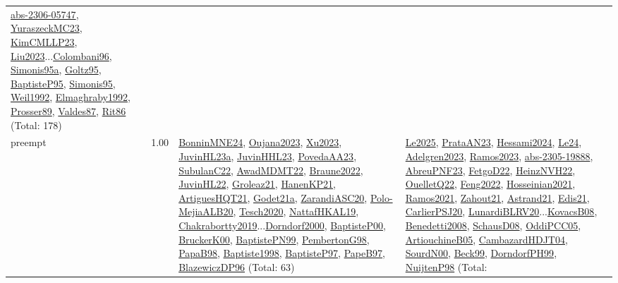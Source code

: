 {\begin{longtable}{p{3cm}r>{\raggedright\arraybackslash}p{6cm}>{\raggedright\arraybackslash}p{6cm}>{\raggedright\arraybackslash}p{8cm}}
\hyperref[detail:abs-2306-05747]{abs-2306-05747}, \hyperref[detail:YuraszeckMC23]{YuraszeckMC23}, \hyperref[detail:KimCMLLP23]{KimCMLLP23}, \hyperref[detail:Liu2023]{Liu2023}...\hyperref[detail:Colombani96]{Colombani96}, \hyperref[detail:Simonis95a]{Simonis95a}, \hyperref[detail:Goltz95]{Goltz95}, \hyperref[detail:BaptisteP95]{BaptisteP95}, \hyperref[detail:Simonis95]{Simonis95}, \hyperref[detail:Weil1992]{Weil1992}, \hyperref[detail:Elmaghraby1992]{Elmaghraby1992}, \hyperref[detail:Prosser89]{Prosser89}, \hyperref[detail:Valdes87]{Valdes87}, \hyperref[detail:Rit86]{Rit86} (Total: 178)\\
\index{preempt}\index{Concepts!preempt}preempt &  1.00 & \hyperref[detail:BonninMNE24]{BonninMNE24}, \hyperref[detail:Oujana2023]{Oujana2023}, \hyperref[detail:Xu2023]{Xu2023}, \hyperref[detail:JuvinHL23a]{JuvinHL23a}, \hyperref[detail:JuvinHHL23]{JuvinHHL23}, \hyperref[detail:PovedaAA23]{PovedaAA23}, \hyperref[detail:SubulanC22]{SubulanC22}, \hyperref[detail:AwadMDMT22]{AwadMDMT22}, \hyperref[detail:Braune2022]{Braune2022}, \hyperref[detail:JuvinHL22]{JuvinHL22}, \hyperref[detail:Groleaz21]{Groleaz21}, \hyperref[detail:HanenKP21]{HanenKP21}, \hyperref[detail:ArtiguesHQT21]{ArtiguesHQT21}, \hyperref[detail:Godet21a]{Godet21a}, \hyperref[detail:ZarandiASC20]{ZarandiASC20}, \hyperref[detail:Polo-MejiaALB20]{Polo-MejiaALB20}, \hyperref[detail:Tesch2020]{Tesch2020}, \hyperref[detail:NattafHKAL19]{NattafHKAL19}, \hyperref[detail:Chakrabortty2019]{Chakrabortty2019}...\hyperref[detail:Dorndorf2000]{Dorndorf2000}, \hyperref[detail:BaptisteP00]{BaptisteP00}, \hyperref[detail:BruckerK00]{BruckerK00}, \hyperref[detail:BaptistePN99]{BaptistePN99}, \hyperref[detail:PembertonG98]{PembertonG98}, \hyperref[detail:PapaB98]{PapaB98}, \hyperref[detail:Baptiste1998]{Baptiste1998}, \hyperref[detail:BaptisteP97]{BaptisteP97}, \hyperref[detail:PapeB97]{PapeB97}, \hyperref[detail:BlazewiczDP96]{BlazewiczDP96} (Total: 63) & \hyperref[detail:Le2025]{Le2025}, \hyperref[detail:PrataAN23]{PrataAN23}, \hyperref[detail:Hessami2024]{Hessami2024}, \hyperref[detail:Le24]{Le24}, \hyperref[detail:Adelgren2023]{Adelgren2023}, \hyperref[detail:Ramos2023]{Ramos2023}, \hyperref[detail:abs-2305-19888]{abs-2305-19888}, \hyperref[detail:AbreuPNF23]{AbreuPNF23}, \hyperref[detail:FetgoD22]{FetgoD22}, \hyperref[detail:HeinzNVH22]{HeinzNVH22}, \hyperref[detail:OuelletQ22]{OuelletQ22}, \hyperref[detail:Feng2022]{Feng2022}, \hyperref[detail:Hosseinian2021]{Hosseinian2021}, \hyperref[detail:Ramos2021]{Ramos2021}, \hyperref[detail:Zahout21]{Zahout21}, \hyperref[detail:Astrand21]{Astrand21}, \hyperref[detail:Edis21]{Edis21}, \hyperref[detail:CarlierPSJ20]{CarlierPSJ20}, \hyperref[detail:LunardiBLRV20]{LunardiBLRV20}...\hyperref[detail:KovacsB08]{KovacsB08}, \hyperref[detail:Benedetti2008]{Benedetti2008}, \hyperref[detail:SchausD08]{SchausD08}, \hyperref[detail:OddiPCC05]{OddiPCC05}, \hyperref[detail:ArtiouchineB05]{ArtiouchineB05}, \hyperref[detail:CambazardHDJT04]{CambazardHDJT04}, \hyperref[detail:SourdN00]{SourdN00}, \hyperref[detail:Beck99]{Beck99}, \hyperref[detail:DorndorfPH99]{DorndorfPH99}, \hyperref[detail:NuijtenP98]{NuijtenP98} (Total: 
\end{longtable}}
